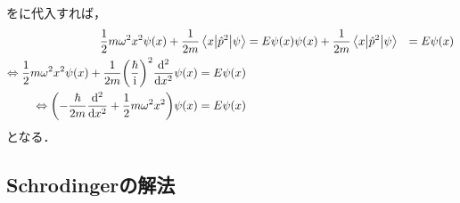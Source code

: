 \documentclass{report}
\begin{document}
    をに代入すれば，
    \begin{align}
      \frac{1}{2}m\omega^2x^2\psi(x) + \frac{1}{2m}\mel**{x}{\hat{p}^2}{\psi} &= E\psi(x)\psi(x) + \frac{1}{2m}\mel**{x}{\hat{p}^2}{\psi} &= E\psi(x) \\ 
      \Leftrightarrow \frac{1}{2}m\omega^2x^2\psi(x) + \frac{1}{2m}\qty(\frac{\hbar}{\mathrm{i}})^2\dv[2]{x}\psi(x) = E\psi(x) \\ 
      \Leftrightarrow \qty(-\frac{\hbar}{2m}\dv[2]{x} + \frac{1}{2}m\omega^2x^2)\psi(x) = E\psi(x)
    \end{align}
    となる．
  \subsection{Schrodingerの解法}
\end{document}
